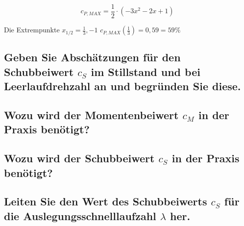 \begin{equation}
c_{P,MAX}=\frac{1}{2} \cdot (-3x^2-2x+1)
\label{eq:CPMAX2}
\end{equation}
 
Die Extrempunkte  $x_{1/2}= \frac{1}{3}, -1$
$c_{P,MAX}(\frac{1}{3})=0,59 = 59\%$

\subsection{Geben Sie Abschätzungen für den Schubbeiwert $c_S$ im Stillstand und bei
Leerlaufdrehzahl an und begründen Sie diese.}



\subsection{Wozu wird der Momentenbeiwert $c_M$ in der Praxis benötigt?}



\subsection{Wozu wird der Schubbeiwert $c_S$ in der Praxis benötigt?}



\subsection{Leiten Sie den Wert des Schubbeiwerts $c_S$ für die Auslegungsschnelllaufzahl $\lambda$
her.}






\label{sec:Vorbereitungsfragen}

